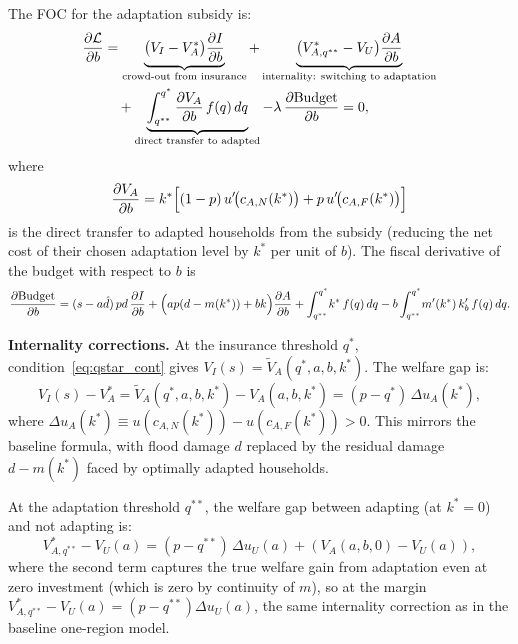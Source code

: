 \documentclass{article}
\begin{document}
The FOC for the adaptation subsidy is:
\begin{align}
    \frac{\partial\mathcal{L}}{\partial b}
    &=
    \underbrace{\bigl(V_I - V_A^*\bigr)\frac{\partial I}{\partial b}}_{\text{crowd-out from insurance}}
    + \underbrace{\bigl(V_{A,q^{**}}^* - V_U\bigr)\frac{\partial A}{\partial b}}_{\text{internality: switching to adaptation}}
    \notag\\
    &\quad
    + \underbrace{\int_{q^{**}}^{q^*} \frac{\partial V_A}{\partial b}\,f(q)\,dq}_{\text{direct transfer to adapted}}
    - \lambda\,\frac{\partial\text{Budget}}{\partial b}
    = 0, \label{eq:foc_b_cont}
\end{align}
where
\begin{equation}
    \frac{\partial V_A}{\partial b} = k^*\Bigl[(1-p)\,u'\!\bigl(c_{A,N}(k^*)\bigr) + p\,u'\!\bigl(c_{A,F}(k^*)\bigr)\Bigr]
\end{equation}
is the direct transfer to adapted households from the subsidy (reducing the net cost of their chosen adaptation level by $k^*$ per unit of $b$). The fiscal derivative of the budget with respect to $b$ is
\begin{equation}
    \frac{\partial\text{Budget}}{\partial b}
    = (s - a\hat{d})\,pd\,\frac{\partial I}{\partial b}
    + \Bigl(ap(d-m(k^*))+bk\Bigr)\frac{\partial A}{\partial b}
    + \int_{q^{**}}^{q^*}\! k^*\,f(q)\,dq
    - b\int_{q^{**}}^{q^*}\! m'(k^*)\,k'_b\,f(q)\,dq. \label{eq:budget_deriv_b}
\end{equation}

\textbf{Internality corrections.} At the insurance threshold $q^*$, condition~\eqref{eq:qstar_cont} gives $V_I(s) = \tilde{V}_A(q^*,a,b,k^*)$. The welfare gap is:
\begin{equation}
    V_I(s) - V_A^* = \tilde{V}_A(q^*,a,b,k^*) - V_A(a,b,k^*)
    = (p - q^*)\,\Delta u_A(k^*), \label{eq:internality_cont}
\end{equation}
where $\Delta u_A(k^*) \equiv u(c_{A,N}(k^*)) - u(c_{A,F}(k^*)) > 0$. This mirrors the baseline formula, with flood damage $d$ replaced by the residual damage $d - m(k^*)$ faced by optimally adapted households.

At the adaptation threshold $q^{**}$, the welfare gap between adapting (at $k^* = 0$) and not adapting is:
\begin{equation}
    V_{A,q^{**}}^* - V_U(a) = (p - q^{**})\,\Delta u_U(a) + (V_A(a,b,0) - V_U(a)), \label{eq:internality_adapt}
\end{equation}
where the second term captures the true welfare gain from adaptation even at zero investment (which is zero by continuity of $m$), so at the margin $V_{A,q^{**}}^* - V_U(a) = (p - q^{**})\Delta u_U(a)$, the same internality correction as in the baseline one-region model.
\end{document}
